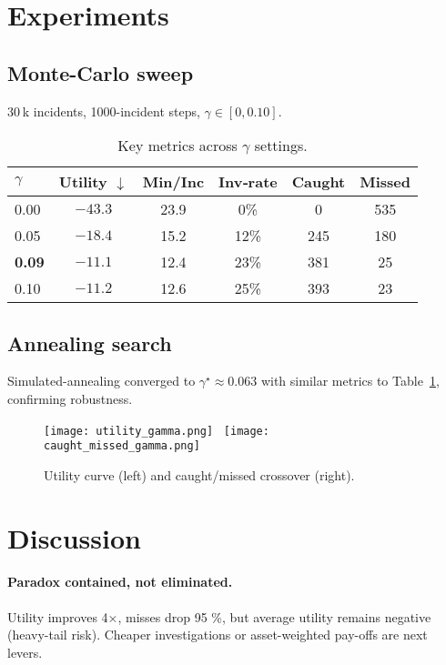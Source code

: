 \documentclass[11pt]{article}
\begin{document}
\section{Experiments}
\subsection{Monte-Carlo sweep}
30 k incidents, 1000-incident steps, $\gamma\!\in\![0,0.10]$.

\begin{table}[h]
\centering
\begin{tabular}{@{}lccccc@{}}\toprule
$\gamma$ & Utility $\downarrow$ & Min/Inc & Inv‐rate & Caught & Missed\\\midrule
0.00 & $-43.3$ & 23.9 & 0\% & 0 & 535\\
0.05 & $-18.4$ & 15.2 & 12\% & 245 & 180\\
\textbf{0.09} & $\bm{-11.1}$ & 12.4 & 23\% & 381 & 25\\
0.10 & $-11.2$ & 12.6 & 25\% & 393 & 23\\\bottomrule
\end{tabular}
\caption{Key metrics across $\gamma$ settings.\label{tab:sweep}}
\end{table}

\subsection{Annealing search}
Simulated-annealing converged to $\gamma^\star\!\approx\!0.063$
with similar metrics to Table~\ref{tab:sweep}, confirming robustness.

\begin{figure}[h]
\centering
\texttt{[image: utility\_gamma.png]}~
\texttt{[image: caught\_missed\_gamma.png]}
\caption{Utility curve (left) and caught/missed crossover (right).}
\label{fig:curves}
\end{figure}

\section{Discussion}
\paragraph{Paradox contained, not eliminated.}
Utility improves 4×, misses drop 95 \%, but average
utility remains negative (heavy-tail risk).
Cheaper investigations or asset-weighted pay-offs are next levers.
\end{document}

